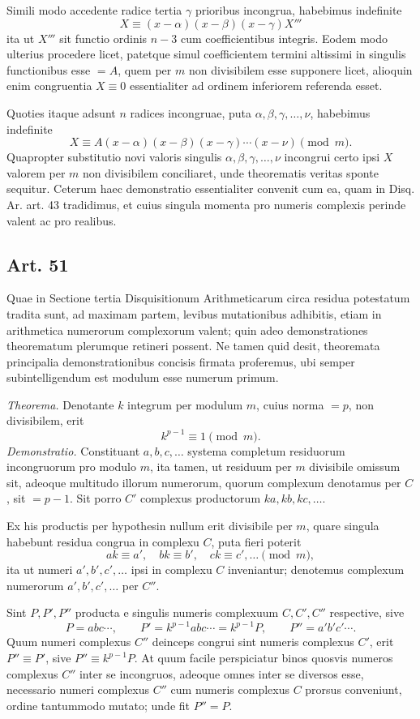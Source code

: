 \documentclass[12pt]{article}
\newcommand{\art}[1]{\subsection*{Art. #1}}
\begin{document}
Simili modo accedente radice tertia $\gamma$ prioribus incongrua, habebimus indefinite
\[
X\equiv (x-\alpha)(x-\beta)(x-\gamma)X'''
\]
ita ut $X'''$ sit functio ordinis $n-3$ cum coefficientibus integris. Eodem modo ulterius procedere licet, patetque simul coefficientem termini altissimi in singulis functionibus esse $=A$, quem per $m$ non divisibilem esse supponere licet, alioquin enim congruentia $X\equiv0$ essentialiter ad ordinem inferiorem referenda esset.

Quoties itaque adsunt $n$ radices incongruae, puta $\alpha,\beta,\gamma,\ldots,\nu$, habebimus indefinite
\[
X\equiv A(x-\alpha)(x-\beta)(x-\gamma)\cdots(x-\nu)\pmod m.
\]
Quapropter substitutio novi valoris singulis $\alpha,\beta,\gamma,\ldots,\nu$ incongrui certo ipsi $X$ valorem per $m$ non divisibilem conciliaret, unde theorematis veritas sponte sequitur. Ceterum haec demonstratio essentialiter convenit cum ea, quam in Disq. Ar. art. 43 tradidimus, et cuius singula momenta pro numeris complexis perinde valent ac pro realibus.

\art{51}
Quae in Sectione tertia Disquisitionum Arithmeticarum circa residua potestatum tradita sunt, ad maximam partem, levibus mutationibus adhibitis, etiam in arithmetica numerorum complexorum valent; quin adeo demonstrationes theorematum plerumque retineri possent. Ne tamen quid desit, theoremata principalia demonstrationibus concisis firmata proferemus, ubi semper subintelligendum est modulum esse numerum primum.

\emph{Theorema.} Denotante $k$ integrum per modulum $m$, cuius norma $=p$, non divisibilem, erit
\[
k^{p-1}\equiv1\pmod m.
\]
\emph{Demonstratio.} Constituant $a,b,c,\ldots$ systema completum residuorum incongruorum pro modulo $m$, ita tamen, ut residuum per $m$ divisibile omissum sit, adeoque multitudo illorum numerorum, quorum complexum denotamus per $C$, sit $=p-1$. Sit porro $C'$ complexus productorum $ka,kb,kc,\ldots$.

Ex his productis per hypothesin nullum erit divisibile per $m$, quare singula habebunt residua congrua in complexu $C$, puta fieri poterit
\[
ak\equiv a',\quad bk\equiv b',\quad ck\equiv c',\ldots\pmod m,
\]
ita ut numeri $a',b',c',\ldots$ ipsi in complexu $C$ inveniantur; denotemus complexum numerorum $a',b',c',\ldots$ per $C''$.

Sint $P,P',P''$ producta e singulis numeris complexuum $C,C',C''$ respective, sive
\[
P=abc\cdots,
\qquad
P'=k^{p-1}abc\cdots=k^{p-1}P,
\qquad
P''=a'b'c'\cdots.
\]
Quum numeri complexus $C''$ deinceps congrui sint numeris complexus $C'$, erit $P''\equiv P'$, sive $P''\equiv k^{p-1}P$. At quum facile perspiciatur binos quosvis numeros complexus $C''$ inter se incongruos, adeoque omnes inter se diversos esse, necessario numeri complexus $C''$ cum numeris complexus $C$ prorsus conveniunt, ordine tantummodo mutato; unde fit $P''=P$.
\end{document}
